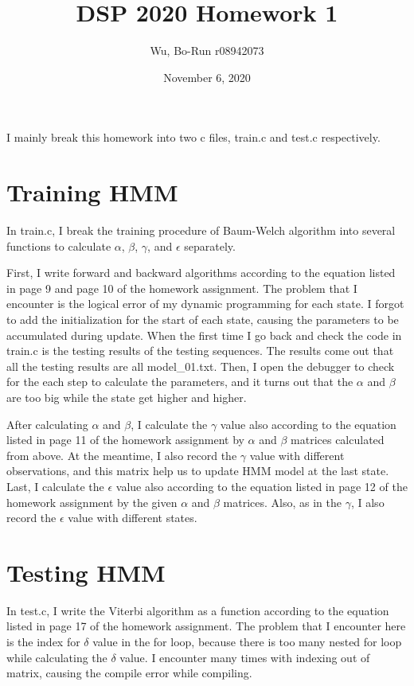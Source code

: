 \documentclass{article}
\title{DSP 2020 Homework 1}
\author{Wu, Bo-Run r08942073}
\date{November 6, 2020}
\begin{document}
\maketitle

\begin{center}
    I mainly break this homework into two c files, train.c and test.c respectively.
\end{center}

\section{Training HMM}

In train.c, I break the training procedure of Baum-Welch algorithm into several functions to calculate $\alpha$, $\beta$, $\gamma$, and $\epsilon$ separately.

First, I write forward and backward algorithms according to the equation listed in page 9 and page 10 of the homework assignment. The problem that I encounter is the logical error of my dynamic programming for each state. I forgot to add the initialization for the start of each state, causing the parameters to be accumulated during update. When the first time I go back and check the code in train.c is the testing results of the testing sequences. The results come out that all the testing results are all model\_01.txt. Then, I open the debugger to check for the each step to calculate the parameters, and it turns out that the $\alpha$ and $\beta$ are too big while the state get higher and higher.

After calculating $\alpha$ and $\beta$, I calculate the $\gamma$ value also according to the equation listed in page 11 of the homework assignment by $\alpha$ and $\beta$ matrices calculated from above. At the meantime, I also record the $\gamma$ value with different observations, and this matrix help us to update HMM model at the last state. Last, I calculate the $\epsilon$ value also according to the equation listed in page 12 of the homework assignment by the given $\alpha$ and $\beta$ matrices. Also, as in the $\gamma$, I also record the $\epsilon$ value with different states.

\section{Testing HMM}

In test.c, I write the Viterbi algorithm as a function according to the equation listed in page 17 of the homework assignment. The problem that I encounter here is the index for $\delta$ value in the for loop, because there is too many nested for loop while calculating the $\delta$ value. I encounter many times with indexing out of matrix, causing the compile error while compiling.
\end{document}
